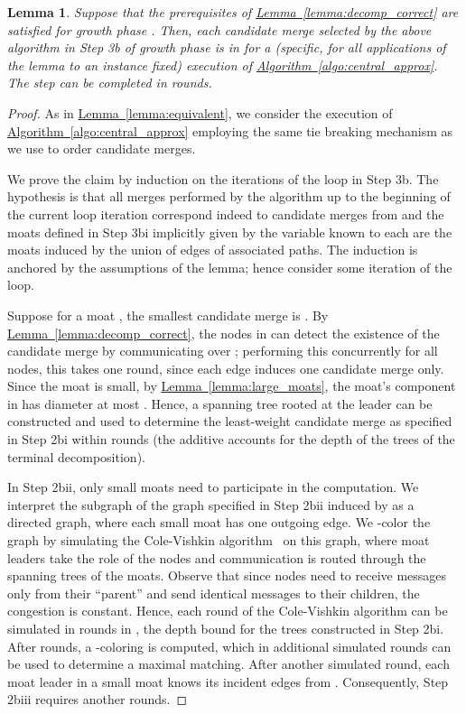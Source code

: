 \documentclass[letterpaper,11pt]{article}
\newtheorem{lemma}[theorem]{Lemma}
\newcommand{\namedref}[2]{\hyperref[#2]{#1~\ref*{#2}}}
\newcommand{\lemmaref}[1]{\namedref{Lemma}{#1}}
\newcommand{\algref}[1]{\namedref{Algorithm}{#1}}
\begin{document}
\begin{lemma}\label{lemma:growth_3b}
Suppose that the prerequisites of \lemmaref{lemma:decomp_correct} are satisfied
for growth phase . Then, each candidate merge selected by the above
algorithm in Step 3b of growth phase  is in  for a (specific, for all
applications of the lemma to an instance fixed) execution of
\algref{algo:central_approx}. The step can be completed in 
rounds.
\end{lemma}
\begin{proof}As in \lemmaref{lemma:equivalent}, we consider the execution of
\algref{algo:central_approx} employing the same tie breaking mechanism as we use
to order candidate merges.

We prove the claim by induction on the iterations of the loop in Step 3b. The
hypothesis is that all merges performed by the algorithm up to the beginning of
the current loop iteration correspond indeed to candidate merges from  and
the moats  defined in Step 3bi implicitly given by the variable 
known to each  are the moats induced by the union of edges of associated
paths. The induction is anchored by the assumptions of the lemma; hence consider
some iteration of the loop.

Suppose for a moat , the smallest candidate merge is
. By \lemmaref{lemma:decomp_correct}, the nodes in 
can detect the existence of the candidate merge by communicating over ;
performing this concurrently for all nodes, this takes one round, since each
edge induces one candidate merge only. Since the moat is small, by
\lemmaref{lemma:large_moats}, the moat's component in  has diameter at
most . Hence, a spanning tree rooted at the leader can be constructed
and used to determine the least-weight candidate merge as specified in Step 2bi
within  rounds (the additive  accounts for the depth of the
trees of the terminal decomposition).

In Step 2bii, only small moats  need to participate in the computation.
We interpret the subgraph of the graph specified in Step 2bii induced by 
as a directed graph, where each small moat has one outgoing edge. We -color
the graph by simulating the Cole-Vishkin algorithm~\cite{CV-86} on this graph,
where moat leaders take the role of the nodes and communication is routed
through the spanning trees of the moats. Observe that since nodes need to
receive messages only from their ``parent'' and send identical messages to their
children, the congestion is constant. Hence, each round of the Cole-Vishkin
algorithm can be simulated in  rounds in , the depth bound for
the trees constructed in Step 2bi. After  rounds, a
-coloring is computed, which in  additional simulated rounds can be used
to determine a maximal matching. After another simulated round, each moat
leader in a small moat knows its incident edges from . Consequently, Step
2biii requires another  rounds.


\end{proof}
\end{document}
